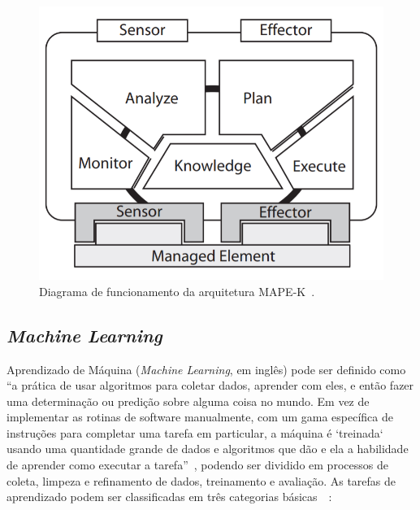 \documentclass[twocolumn]{article}
\begin{document}
\begin{figure}[H]
\centering
\includegraphics[scale=0.5]{images/MAPE-K.png}
\caption {Diagrama de funcionamento da arquitetura MAPE-K~\citep{Abbas_2010}.}
\label{fig:MAPEK}
\end{figure}

\subsection{\textit{Machine Learning}}
Aprendizado de Máquina (\textit{Machine Learning}, em inglês) pode ser definido como “a prática de usar algoritmos para coletar dados, aprender com eles, e então fazer uma determinação ou predição sobre alguma coisa no mundo. Em vez de implementar as rotinas de software manualmente, com um gama específica de instruções para completar uma tarefa em particular, a máquina é `treinada` usando uma quantidade grande de dados e algoritmos que dão e ela a habilidade de aprender como executar a tarefa”~\citep{Copeland_2016}, podendo ser dividido em processos de coleta, limpeza e refinamento de dados, treinamento e avaliação. As tarefas de aprendizado podem ser classificadas em três categorias básicas~\citep{MLWikipedia_2021}~\citep{MLSAS_2021}:
\end{document}

